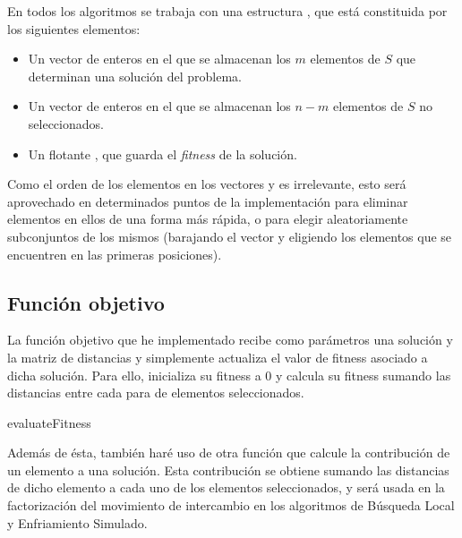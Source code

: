 \documentclass[10pt,a4paper]{article}
\begin{document}
En todos los algoritmos se trabaja con una estructura , que está constituida por los siguientes elementos:

\begin{itemize}
	\item Un vector de enteros  en el que se almacenan los $m$ elementos de $S$ que determinan una solución del problema.
	\item Un vector de enteros  en el que se almacenan los $n-m$ elementos de $S$ no seleccionados.
	\item Un flotante , que guarda el \textit{fitness} de la solución.
\end{itemize}

Como el orden de los elementos en los vectores  y  es irrelevante, esto será aprovechado en determinados puntos de la implementación para eliminar elementos en ellos de una forma más rápida, o para elegir aleatoriamente subconjuntos de los mismos (barajando el vector y eligiendo los elementos que se encuentren en las primeras posiciones).



\subsection{Función objetivo}

La función objetivo que he implementado recibe como parámetros una solución y la matriz de distancias y simplemente actualiza el valor de fitness asociado a dicha solución. Para ello, inicializa su fitness a 0 y calcula su fitness sumando las distancias entre cada para de elementos seleccionados.

\begin{algorithm}[H]
	\caption{evaluateFitness}
\end{algorithm}

Además de ésta, también haré uso de otra función que calcule la contribución de un elemento a una solución. Esta contribución se obtiene sumando las distancias de dicho elemento a cada uno de los elementos seleccionados, y será usada en la factorización del movimiento de intercambio en los algoritmos de Búsqueda Local y Enfriamiento Simulado.
\end{document}
